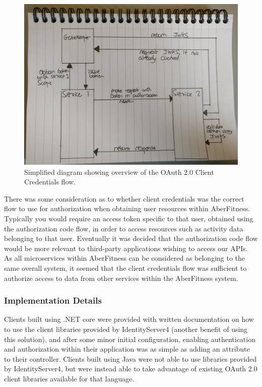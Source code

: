 \begin{figure}[H]
    \centering
    \includegraphics[width=\textwidth]{Images/gatekeeper_clientcredentials_flow.png}
    \caption{Simplified diagram showing overview of the OAuth 2.0 Client Credentials flow.}
\end{figure}

There was some consideration as to whether client credentials was the correct flow to use for authorization when obtaining user resources within AberFitness.  Typically you would require an access token specific to that user, obtained using the authorization code flow, in order to access resources such as activity data belonging to that user.  Eventually it was decided that the authorization code flow would be more relevant to third-party applications wishing to access our APIs.  As all microservices within AberFitness can be considered as belonging to the same overall system, it seemed that the client credentials flow was sufficient to authorize access to data from other services within the AberFitness system.

\subsubsection{Implementation Details}

Clients built using .NET core were provided with written documentation on how to use the client libraries provided by IdentityServer4 (another benefit of using this solution), and after some minor initial configuration, enabling authentication and authorization within their application was as simple as adding an attribute to their controller.  Clients built using Java were not able to use libraries provided by IdentityServer4, but were instead able to take advantage of existing OAuth 2.0 client libraries available for that language.

